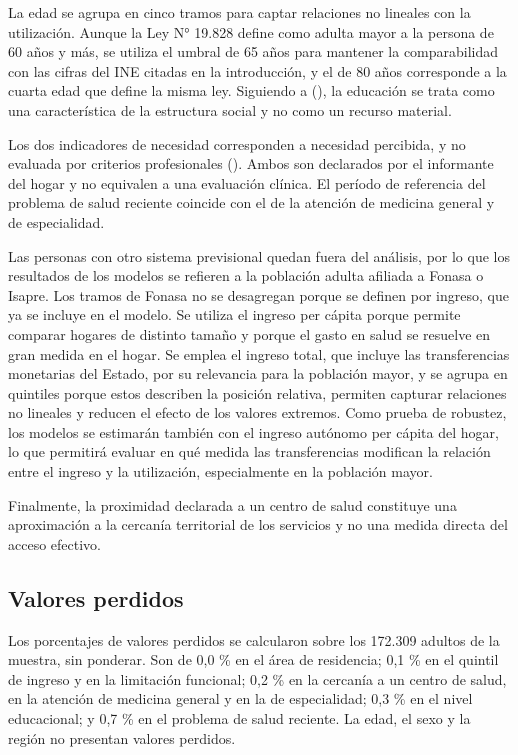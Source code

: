\documentclass[
  spanish,
  a4paper,
  oneside]{scrbook}
\begin{document}
\begin{longtable}[t]{>{\raggedright\arraybackslash}p{3cm}>{\raggedright\arraybackslash}p{3.5cm}>{\raggedright\arraybackslash}p{2cm}>{\raggedright\arraybackslash}p{6.5cm}}
\end{longtable}

La edad se agrupa en cinco tramos para captar relaciones no lineales con
la utilización. Aunque la Ley N° 19.828 define como adulta mayor a la
persona de 60 años y más, se utiliza el umbral de 65 años para mantener
la comparabilidad con las cifras del INE citadas en la introducción, y
el de 80 años corresponde a la cuarta edad que define la misma ley.
Siguiendo a (),
la educación se trata como una característica de la estructura social y
no como un recurso material.

Los dos indicadores de necesidad corresponden a necesidad percibida, y
no evaluada por criterios profesionales
(). Ambos son
declarados por el informante del hogar y no equivalen a una evaluación
clínica. El período de referencia del problema de salud reciente
coincide con el de la atención de medicina general y de especialidad.

Las personas con otro sistema previsional quedan fuera del análisis, por
lo que los resultados de los modelos se refieren a la población adulta
afiliada a Fonasa o Isapre. Los tramos de Fonasa no se desagregan porque
se definen por ingreso, que ya se incluye en el modelo. Se utiliza el
ingreso per cápita porque permite comparar hogares de distinto tamaño y
porque el gasto en salud se resuelve en gran medida en el hogar. Se
emplea el ingreso total, que incluye las transferencias monetarias del
Estado, por su relevancia para la población mayor, y se agrupa en
quintiles porque estos describen la posición relativa, permiten capturar
relaciones no lineales y reducen el efecto de los valores extremos. Como
prueba de robustez, los modelos se estimarán también con el ingreso
autónomo per cápita del hogar, lo que permitirá evaluar en qué medida
las transferencias modifican la relación entre el ingreso y la
utilización, especialmente en la población mayor.

Finalmente, la proximidad declarada a un centro de salud constituye una
aproximación a la cercanía territorial de los servicios y no una medida
directa del acceso efectivo.

\subsection{Valores perdidos}\label{valores-perdidos}

Los porcentajes de valores perdidos se calcularon sobre los 172.309
adultos de la muestra, sin ponderar. Son de 0,0 \% en el área de
residencia; 0,1 \% en el quintil de ingreso y en la limitación
funcional; 0,2 \% en la cercanía a un centro de salud, en la atención de
medicina general y en la de especialidad; 0,3 \% en el nivel
educacional; y 0,7 \% en el problema de salud reciente. La edad, el sexo
y la región no presentan valores perdidos.
\end{document}
